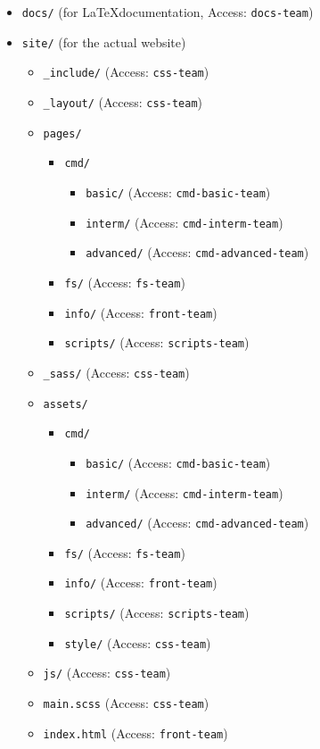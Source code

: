 \documentclass[hidelinks,12pt,a4paper,numbers=enddot]{scrartcl}
\begin{document}
\begin{itemize}
\item \texttt{docs/} (for \LaTeX documentation, Access: \texttt{docs-team})
\item \texttt{site/} (for the actual website)
	\begin{itemize}
	\item \texttt{\_include/} (Access: \texttt{css-team})
	\item \texttt{\_layout/} (Access: \texttt{css-team})
	\item \texttt{pages/}
		\begin{itemize}
            \item \texttt{cmd/}
			\begin{itemize}
			\item \texttt{basic/} (Access: \texttt{cmd-basic-team})
			\item \texttt{interm/} (Access: \texttt{cmd-interm-team})
			\item \texttt{advanced/} (Access: \texttt{cmd-advanced-team})
			\end{itemize}
		\item \texttt{fs/} (Access: \texttt{fs-team})
		\item \texttt{info/} (Access: \texttt{front-team})
		\item \texttt{scripts/} (Access: \texttt{scripts-team})
		\end{itemize}
	\item \texttt{\_sass/} (Access: \texttt{css-team})
	\item \texttt{assets/}
		\begin{itemize}
		\item \texttt{cmd/}
			\begin{itemize}
			\item \texttt{basic/} (Access: \texttt{cmd-basic-team})
			\item \texttt{interm/} (Access: \texttt{cmd-interm-team})
			\item \texttt{advanced/} (Access: \texttt{cmd-advanced-team})
			\end{itemize}
		\item \texttt{fs/} (Access: \texttt{fs-team})
		\item \texttt{info/} (Access: \texttt{front-team})
		\item \texttt{scripts/} (Access: \texttt{scripts-team})
		\item \texttt{style/} (Access: \texttt{css-team})
		\end{itemize}
	\item \texttt{js/} (Access: \texttt{css-team})
	\item \texttt{main.scss} (Access: \texttt{css-team})
	\item \texttt{index.html} (Access: \texttt{front-team})
	\end{itemize}
\end{itemize}
\end{document}
